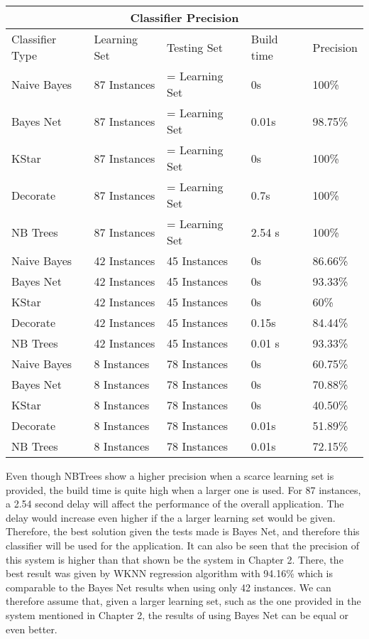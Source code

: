 \begin{tabular}{ |p{3cm}|p{3cm}|p{3cm}|p{2cm}|p{2cm}| }
 \hline
 \multicolumn{5}{|c|}{Classifier Precision} \\
 \hline
 Classifier Type & Learning Set & Testing Set & Build time & Precision\\
 \hline
 Naive Bayes & 87 Instances & = Learning Set & 0s & 100\% \\
 Bayes Net   & 87 Instances & = Learning Set & 0.01s & 98.75\% \\
 KStar       & 87 Instances & = Learning Set & 0s & 100\% \\
 Decorate    & 87 Instances & = Learning Set & 0.7s & 100\% \\
 NB Trees    & 87 Instances & = Learning Set & 2.54 s & 100\% \\
 Naive Bayes & 42 Instances & 45 Instances   & 0s & 86.66\% \\
 Bayes Net   & 42 Instances & 45 Instances   & 0s & 93.33\% \\
 KStar       & 42 Instances & 45 Instances   & 0s & 60\% \\
 Decorate    & 42 Instances & 45 Instances   & 0.15s & 84.44\% \\
 NB Trees    & 42 Instances & 45 Instances   & 0.01 s & 93.33\% \\
 Naive Bayes & 8 Instances  & 78 Instances   & 0s & 60.75\% \\
 Bayes Net   & 8 Instances  & 78 Instances   & 0s & 70.88\% \\
 KStar       & 8 Instances  & 78 Instances   & 0s & 40.50\% \\
 Decorate    & 8 Instances  & 78 Instances   & 0.01s & 51.89\% \\
 NB Trees    & 8 Instances  & 78 Instances   & 0.01s & 72.15\% \\
 \hline
\end{tabular}

\medskip \noindent Even though NBTrees show a higher precision when a scarce learning set is provided, the build time is quite high when a larger one is used. For 87 instances, a 2.54 second delay will affect the performance of the overall application. The delay would increase even higher if the a larger learning set would be given. Therefore, the best solution given the tests made is Bayes Net, and therefore this classifier will be used for the application.
It can also be seen that the precision of this system is higher than that shown be the system in Chapter 2. There, the best result was given by WKNN regression algorithm with 94.16\% which is comparable to the Bayes Net results when using only 42 instances. We can therefore assume that, given a larger learning set, such as the one provided in the system mentioned in Chapter 2, the results of using Bayes Net can be equal or even better.


